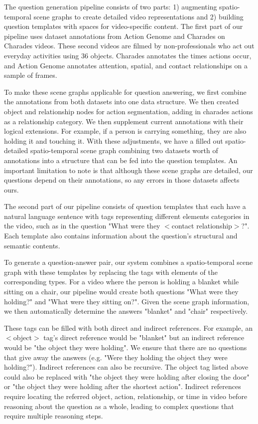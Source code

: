 \documentclass[10pt,twocolumn,letterpaper]{article}
\newcommand{\mgm}[1]{{\color{cyan}{mgm: #1}}}
\begin{document}
The question generation pipeline consists of two parts: 1) augmenting spatio-temporal scene graphs to create detailed video representations and 2) building question templates with spaces for video-specific content. The first part of our pipeline uses dataset annotations from Action Genome and Charades \cite{ji2020action, sigurdsson2016hollywood} on Charades videos. These \mgm{30-90} second videos are filmed by non-professionals who act out everyday activities using 36 objects. Charades annotates the times actions occur, and Action Genome annotates attention, spatial, and contact relationships on a sample of frames. 

To make these scene graphs applicable for question answering, we first combine the annotations from both datasets into one data structure. We then created object and relationship nodes for action segmentation, adding in charades actions as a relationship category. We then supplement current annotations with their logical extensions. For example, if a person is carrying something, they are also holding it and touching it. With these adjustments, we have a filled out spatio-detailed spatio-temporal scene graph combining two datasets worth of annotations into a structure that can be fed into the question templates. An important limitation to note is that although these scene graphs are detailed, our questions depend on their annotations, so any errors in those datasets affects ours.
    
The second part of our pipeline consists of question templates that each have a natural language sentence with tags representing different elements categories in the video, such as in the question "What were they $<$contact relationship$>$?". Each template also contains information about the question's structural and semantic contents. 

To generate a question-answer pair, our system combines a spatio-temporal scene graph with these templates by replacing the tags with elements of the corresponding types. For a video where the person is holding a blanket while sitting on a chair, our pipeline would create both questions "What were they holding?" and "What were they sitting on?". Given the scene graph information, we then automatically determine the answers "blanket" and "chair" respectively. 

These tags can be filled with both direct and indirect references. For example, an $<$object$>$ tag's direct reference would be "blanket" but an indirect reference would be "the object they were holding". We ensure that there are no questions that give away the answers (e.g. "Were they holding the object they were holding?"). Indirect references can also be recursive. The object tag listed above could also be replaced with "the object they were holding after closing the door" or "the object they were holding after the shortest action". Indirect references require locating the referred object, action, relationship, or time in video before reasoning about the question as a whole, leading to complex questions that require multiple reasoning steps. 
\end{document}
